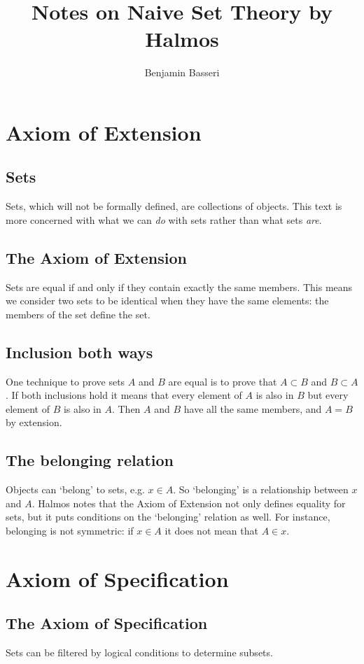 \documentclass{article}
\title{Notes on Naive Set Theory by Halmos}
\author{Benjamin Basseri}
\date{ }
\begin{document}
\maketitle

\section{Axiom of Extension}

\subsection{Sets} Sets, which will not be formally defined, are collections of objects. This text is more concerned with what we can \emph{do} with sets rather than what sets \emph{are}.

\subsection{The Axiom of Extension}
Sets are equal if and only if they contain exactly the same members. This means we consider two sets to be identical when they have the same elements: the members of the set define the set.

\subsection{Inclusion both ways}
One technique to prove sets $A$ and $B$ are equal is to prove that $A \subset B$ and $B \subset A$. If both inclusions hold it means that every element of $A$ is also in $B$ but every element of $B$ is also in $A$. Then $A$ and $B$ have all the same members, and $A = B$ by extension.

\subsection{The belonging relation} 
Objects can `belong' to sets, e.g. $x \in A$. So `belonging' is a relationship between $x$ and $A$. Halmos notes that the Axiom of Extension not only defines equality for sets, but it puts conditions on the `belonging' relation as well. For instance, belonging is not symmetric: if $x \in A$ it does not mean that $A \in x$.

\section{Axiom of Specification}

\subsection{The Axiom of Specification} Sets can be filtered by logical conditions to determine subsets.
\end{document}
